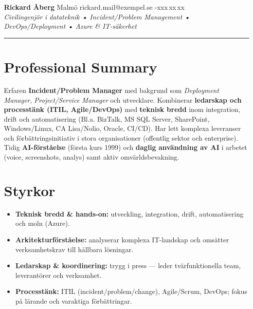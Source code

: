 \documentclass[11pt,a4paper]{article}
\begin{document}
{\LARGE \textbf{Rickard Åberg} \normalsize \quad Malmö \quad rickard.mail@exempel.se -xxx\,xx\,xx}\\[2pt]
\textit{Civilingenjör i datateknik • Incident/Problem Management • DevOps/Deployment • Azure \& IT-säkerhet}

\hrule
\vspace{0.8em}

\section*{Professional Summary}
Erfaren \textbf{Incident/Problem Manager} med bakgrund som \textit{Deployment Manager}, \textit{Project/Service Manager} och utvecklare.
Kombinerar \textbf{ledarskap och processtänk (ITIL, Agile/DevOps)} med \textbf{teknisk bredd} inom integration, drift och automatisering
(Bl.a. BizTalk, MS SQL Server, SharePoint, Windows/Linux, CA Lisa/Nolio, Oracle, CI/CD). Har lett komplexa leveranser och
förbättringsinitiativ i stora organisationer (offentlig sektor och enterprise). Tidig \textbf{AI-förståelse} (första kurs 1999) och
\textbf{daglig användning av AI} i arbetet (voice, screenshots, analys) samt aktiv omvärldsbevakning.

\vspace{0.3em}
\section*{Styrkor}
\begin{itemize}
  \item \textbf{Teknisk bredd \& hands-on:} utveckling, integration, drift, automatisering och moln (Azure).
  \item \textbf{Arkitekturförståelse:} analyserar komplexa IT-landskap och omsätter verksamhetskrav till hållbara lösningar.
  \item \textbf{Ledarskap \& koordinering:} trygg i press — leder tvärfunktionella team, leverantörer och verksamhet.
  \item \textbf{Processtänk:} ITIL (incident/problem/change), Agile/Scrum, DevOps; fokus på lärande och varaktiga förbättringar.
\end{itemize}

\vspace{0.3em}
\end{document}
